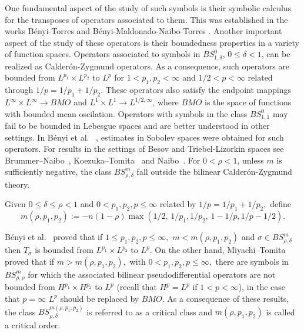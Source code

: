 \documentclass[final,letterpaper,12pt,oneside]{class_diss}
\theoremstyle{remark}
\newcommand{\hcline}{1/p=1/p_1+1/p_2}
\begin{document}
One fundamental aspect of the study of such symbols is their symbolic calculus for the transposes of operators associated to them. This was established in the works B\'enyi-Torres \citep{MR1986065} and B\'enyi-Maldonado-Naibo-Torres \citep{MR2660466}. Another important aspect of the study of these operators is their boundedness properties in a variety of function spaces. Operators associated to symbols in $BS^0_{1,\delta}$, $0\leq\delta < 1$, can be realized as Calder\'on-Zygmund operators. As a consequence, such operators are bounded from $L^{p_1} \times L^{p_2}$ to  $L^p$ for  $1 < p_1, p_2 < \infty$ and $1/2<p <\infty$ related through $\hcline.$ These operators also satisfy the endpoint mappings $L^\infty \times L^\infty \rightarrow BMO$ and $L^1 \times L^1 \rightarrow L^{1/2, \infty}$, where $BMO$ is the space of functions with bounded mean oscilation. Operators with symbols in the class $BS^0_{1,1}$ may fail to be bounded in Lebesgue spaces and are better understood in other settings. In B\'enyi et al. ~\cite{MR1996120, MR2250054, MR1986065}, estimates in Sobolev spaces were obtained for such operators. For results in the settings of Besov and Triebel-Lizorkin spaces see Brummer--Naibo~\cite{MR3750234}, Koezuka--Tomita~\cite{MR3750316} and Naibo~\cite{MR3393696}. For $0<\rho<1$, unless $m$ is sufficiently negative, the class $BS^m_{\rho,\delta}$ fall outside the bilinear Calder\'on-Zygmund theory. 


Given  $0\le \delta\le \rho< 1$  and $0< p_1,p_2,p\le \infty$  related   by $\hcline,$ define 
$$
m(\rho, p_1,p_2):=-n(1-\rho)\max({1}/{2},\,{1}/{p_1},{1}/{p_2},\, 1-1/p, 1/p-1/2).
$$ 

\noindent B\'enyi et al.~\cite{MR3205530} proved that if $1\le p_1,p_2, p\le \infty,$    $m<m(\rho,p_1,p_2)$ and $\sigma\in BS^m_{\rho,\delta}$  then $T_\sigma$ is bounded from $L^{p_1}\times L^{p_2}$ to $L^p.$  On the other hand, Miyachi--Tomita~\cite{MR3179688} proved that  if $m>m(\rho, p_1,p_2),$ with $0< p_1,p_2,p\le \infty,$ there are symbols in $BS^m_{\rho,\rho}$ for which the associated  bilinear pseudodifferential operators are not bounded from $H^{p_1}\times H^{p_2}$ to $L^p$ (recall that $H^p = L^p$ if $1<p<\infty$), in the case that $p=\infty$ $L^p$ should be replaced by $BMO$. As a consequence of these results, the class $BS^{m(\rho,p_1,p_2)}_{\rho,\delta}$ is referred to as a critical class and $m(\rho,p_1,p_2)$ is called a critical order. 
\end{document}
